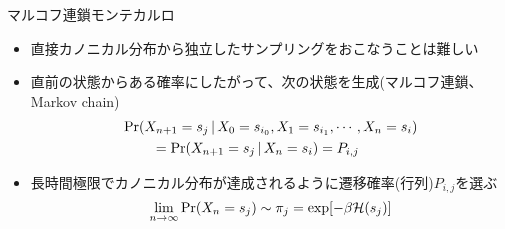 
\begin{frame}[t,fragile]{マルコフ連鎖モンテカルロ}
  \begin{itemize}
  \item 直接カノニカル分布から独立したサンプリングをおこなうことは難しい
  \item 直前の状態からある確率にしたがって、次の状態を生成(マルコフ連鎖、Markov chain)
    \[
    \begin{split}
      &{\rm Pr}(X_{n+1}=s_j \,|\, X_0 = s_{i_0}, X_1 = s_{i_1}, \cdots, X_n = s_{i}) \\
      & \qquad = {\rm Pr}(X_{n+1}=s_j \,|\, X_n = s_{i}) = P_{i,j}
      \end{split}
    \]
    \item 長時間極限でカノニカル分布が達成されるように遷移確率(行列)$P_{i,j}$を選ぶ
      \[
      \lim_{n\rightarrow\infty}{\rm Pr}(X_n=s_j) \sim \pi_j = \exp[-\beta {\cal H}(s_j)]
      \]
  \end{itemize}
\end{frame}
